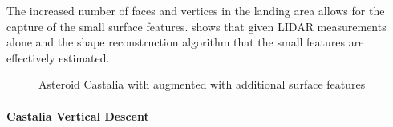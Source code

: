 \documentclass[journal]{new-aiaa}
\begin{document}
The increased number of faces and vertices in the landing area allows for the capture of the small surface features.
 shows that given LIDAR measurements alone and the shape reconstruction algorithm that the small features are effectively estimated.
\begin{figure}[htbp]
    \centering
    \caption{Asteroid Castalia with augmented with additional surface features~\label{fig:castalia_refinement}}
\end{figure}

\paragraph{Castalia Vertical Descent}
\end{document}
